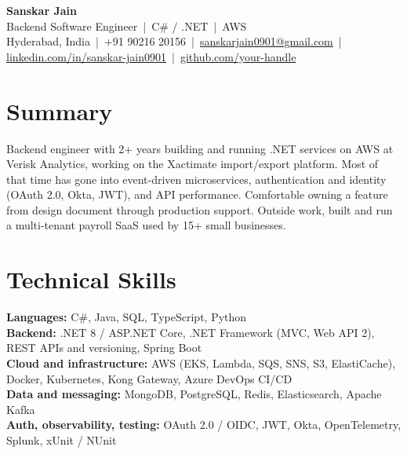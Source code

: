 \documentclass[10pt,a4paper]{article}
\begin{document}
\begin{center}
  {\LARGE\bfseries Sanskar Jain}\\[3pt]
  Backend Software Engineer \,|\, C\# / .NET \,|\, AWS\\[2pt]
  Hyderabad, India \,|\, +91 90216 20156 \,|\,
  \href{mailto:sanskarjain0901@gmail.com}{sanskarjain0901@gmail.com} \,|\,
  \href{https://linkedin.com/in/sanskar-jain0901}{linkedin.com/in/sanskar-jain0901} \,|\,
  \href{https://github.com/your-handle}{github.com/your-handle}
\end{center}

\section{Summary}
Backend engineer with 2+ years building and running .NET services on AWS at Verisk Analytics, working on the Xactimate import/export platform. Most of that time has gone into event-driven microservices, authentication and identity (OAuth 2.0, Okta, JWT), and API performance. Comfortable owning a feature from design document through production support. Outside work, built and run a multi-tenant payroll SaaS used by 15+ small businesses.

\section{Technical Skills}
\textbf{Languages:} C\#, Java, SQL, TypeScript, Python\\
\textbf{Backend:} .NET 8 / ASP.NET Core, .NET Framework (MVC, Web API 2), REST APIs and versioning, Spring Boot\\
\textbf{Cloud and infrastructure:} AWS (EKS, Lambda, SQS, SNS, S3, ElastiCache), Docker, Kubernetes, Kong Gateway, Azure DevOps CI/CD\\
\textbf{Data and messaging:} MongoDB, PostgreSQL, Redis, Elasticsearch, Apache Kafka\\
\textbf{Auth, observability, testing:} OAuth 2.0 / OIDC, JWT, Okta, OpenTelemetry, Splunk, xUnit / NUnit

\end{document}
